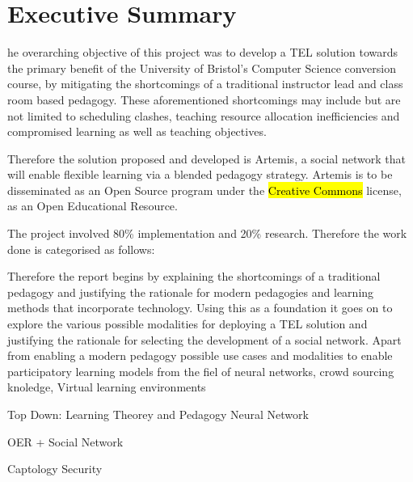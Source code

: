 %
%
%

\chapter*{Executive Summary}
\begin{SingleSpace}





he overarching objective of this project was to develop a TEL solution towards the primary benefit of the University of Bristol's Computer Science conversion course, by mitigating the shortcomings of a traditional instructor lead and class room based pedagogy. These aforementioned shortcomings may include but are not limited to scheduling clashes, teaching resource allocation inefficiencies and compromised learning as well as teaching objectives.

Therefore the solution proposed and developed is Artemis, a social network that will enable flexible learning via a blended pedagogy strategy. Artemis is to be disseminated as an Open Source program under the \hl{Creative Commons} license, as an Open Educational Resource.


The project involved 80\% implementation and 20\% research. Therefore the work done is categorised as follows:





Therefore the report begins by explaining the shortcomings of a traditional pedagogy and justifying the rationale for modern pedagogies and learning methods that incorporate technology. Using this as a foundation it goes on to explore the various possible modalities for deploying a TEL solution and justifying the rationale for selecting the development of a social network. Apart from enabling a modern pedagogy possible use cases and modalities to enable participatory learning models from the fiel of neural networks, crowd sourcing knoledge, Virtual learning environments 


Top Down:
Learning Theorey and Pedagogy
Neural Network

OER + Social Network

Captology
Security





\end{SingleSpace}
\clearpage